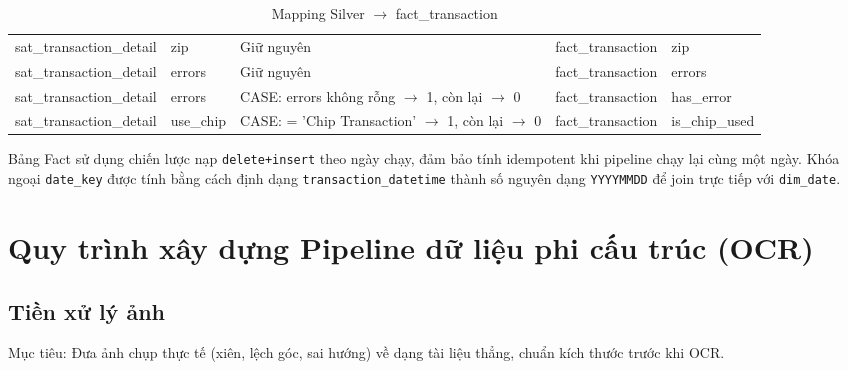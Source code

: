 \begin{table}[H]
{\begin{tabular}{lllll}
sat\_transaction\_detail & zip                   & Giữ nguyên                               & fact\_transaction & zip                   \\
sat\_transaction\_detail & errors                & Giữ nguyên                               & fact\_transaction & errors                \\
sat\_transaction\_detail & errors                & CASE: errors không rỗng $\rightarrow$ 1, còn lại $\rightarrow$ 0 & fact\_transaction & has\_error            \\
sat\_transaction\_detail & use\_chip             & CASE: = 'Chip Transaction' $\rightarrow$ 1, còn lại $\rightarrow$ 0 & fact\_transaction & is\_chip\_used     \\
\hline
\end{tabular}
}
\caption{Mapping Silver $\rightarrow$ fact\_transaction}
\end{table}

Bảng Fact sử dụng chiến lược nạp \texttt{delete+insert} theo ngày chạy,
đảm bảo tính idempotent khi pipeline chạy lại cùng một ngày. Khóa ngoại
\texttt{date\_key} được tính bằng cách định dạng \texttt{transaction\_datetime}
thành số nguyên dạng \texttt{YYYYMMDD} để join trực tiếp với \texttt{dim\_date}.




\section{Quy trình xây dựng Pipeline dữ liệu phi cấu trúc (OCR)}





\subsection{Tiền xử lý ảnh }



Mục tiêu: Đưa ảnh chụp thực tế (xiên, lệch góc, sai hướng) về dạng tài liệu thẳng, chuẩn kích thước trước khi OCR.

